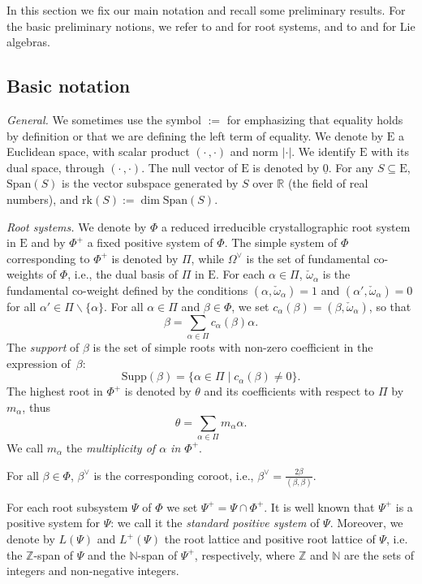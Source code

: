 \documentclass[ALCO,published]{cedram}
\theoremstyle{plain}
\newcommand\smeno{\smallsetminus}
\newcommand\nullvec{\underline 0}
\newcommand\nat{\mathbb N}
\newcommand\ganz{\mathbb Z}
\newcommand\real{\mathbb R}
\newcommand\gen{\mathrm{Span}}
\newcommand\supp{\mathrm{Supp}}
\newcommand\rk{\mathrm{rk}}
\newcommand\al{\alpha}
\newcommand\be{\beta}
\begin{document}
In this section we fix our main notation and recall some preliminary results. 
For the basic preliminary notions, we refer to \cite{Bou} and \cite{HuCox} for root systems, and to \cite{Bou2} and \cite{HuLie} for Lie algebras. 


\subsection{Basic notation}\label{ssec:basic-not}
{\sl General.} We sometimes use the symbol $:=$ for emphasizing  that equality holds by definition or that we are defining the left term of equality.
We denote by $\mathrm E$ a Euclidean space, with scalar product  $(\cdot \,,\cdot )$ and norm $|\cdot |$. We identify $\mathrm E$ with its dual space, through $(\cdot \,,\cdot)$. The null vector of $\mathrm E$ is denoted by $\nullvec$. 
For any $S\subseteq \mathrm E$, $\gen(S)$ is the vector subspace generated by $S$ over $\real$ (the field of real numbers), and $\rk(S):=\dim\gen(S)$.

\par
{\sl Root systems.}
We denote by $\Phi$ a reduced irreducible crystallographic root system in $\mathrm E$ and by $\Phi^+$ a fixed positive system of $\Phi$.
The simple system of $\Phi$ corresponding to  $\Phi^+$ is denoted by $\Pi$,  while $\Omega^\vee$ is the set of fundamental co-weights of $\Phi$, i.e., the  dual basis of $\Pi$ in $\mathrm E$.  
For each $\al\in \Pi$, $\check\omega_\al$ is the fundamental co-weight  defined by the conditions $(\al, \check\omega_\al)=1$ and $(\al', \check \omega_\al)=0$ for all $\al'\in \Pi\smeno \{\al\}$. 
For all $\al\in \Pi$ and $\be \in \Phi$, we set $c_\al(\be)=(\be, \check\omega_\al)$, so that  
$$\be=\sum\limits_{\al\in\Pi}c_\al(\be)\al.$$
The {\it support} of $\be$ is the set of simple roots with non-zero coefficient in the expression of~$\be$: 
$$
\supp(\be)=\{\al\in \Pi\mid c_\al(\be)\neq 0\}.$$
The highest root in $\Phi^+$ is denoted by $\theta$ and its coefficients with respect  to $\Pi$ by $m_\al$, thus
$$\theta=\sum\limits_{\al\in \Pi} m_\al\al.$$ 
We call $m_\al$ the {\it multiplicity of $\al$ in $\Phi^+$}.

\par
For all $\be\in \Phi$, $\be^\vee$ is the corresponding coroot, i.e., $\be^\vee=\frac{2\be}{(\be, \be)}$.

\par
For each root subsystem $\Psi$ of $\Phi$ we set $\Psi^+=\Psi\cap \Phi^+$. 
It is well known that $\Psi^+$ is a positive system for $\Psi$: we call it the {\it standard positive system} of $ \Psi$.
Moreover, we denote by $L(\Psi)$ and $L^+(\Psi)$ the root lattice and positive root lattice of $\Psi$, i.e. the $\ganz$-span of $\Psi$ and the $\nat$-span of $\Psi^+$, respectively, where $\ganz$ and $\nat$ are the sets of integers and non-negative integers. 
\end{document}
